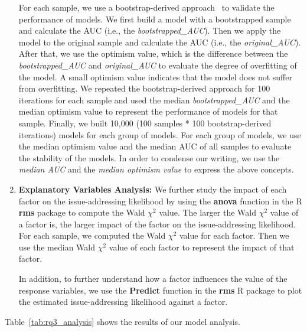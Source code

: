 \documentclass[10pt,journal,compsoc]{IEEEtran}
\begin{document}
\begin{appendices}
\begin{enumerate}
     		 For each sample, we use a bootstrap-derived approach~\cite{efron1986biased} to validate the performance of models. We first build a model with a bootstrapped sample and calculate the AUC (i.e., the \textit{bootstrapped\_AUC}). Then we apply the model to the original sample and calculate the AUC (i.e., the \textit{original\_AUC}). After that, we use the optimism value, which is the difference between the \textit{bootstrapped\_AUC} and \textit{original\_AUC} to evaluate the degree of overfitting of the model. A small optimism value indicates that the model does not suffer from overfitting.
    		  We repeated the bootstrap-derived approach for 100 iterations for each sample and used the median \textit{bootstrapped\_AUC} and the median optimism value to represent the performance of models for that sample.
    		  Finally, we built 10,000 (100 samples * 100 bootstrap-derived iterations) models for each group of models.
     		 For each group of models, we use the median optimism value and the median AUC of all samples to evaluate the stability of the models. In order to condense our writing, we use the \textit{median AUC} and the \textit{median optimism value} to express the above concepts.
     		 
         \item \textbf{Explanatory Variables Analysis:}   
			We further study the impact of each factor on the issue-addressing likelihood by using the \textbf{anova} function in the R \textbf{rms} package to compute the Wald $\chi^2$ value.
  		    The larger the Wald $\chi^2$ value of a factor is, the larger impact of the factor on the issue-addressing likelihood.
   			For each sample, we computed the Wald $\chi^2$ value for each factor. Then we use the median Wald $\chi^2$ value of each factor to represent the impact of that factor.

    		In addition, to further understand how a factor influences the value of the response variables, we use the \textbf{Predict} function in the \textbf{rms} R package to plot the estimated issue-addressing likelihood against a factor. %
      \end{enumerate}
      Table~\ref{tab:rq3_analysis} shows the results of our model analysis. 


\end{appendices}
\end{document}
